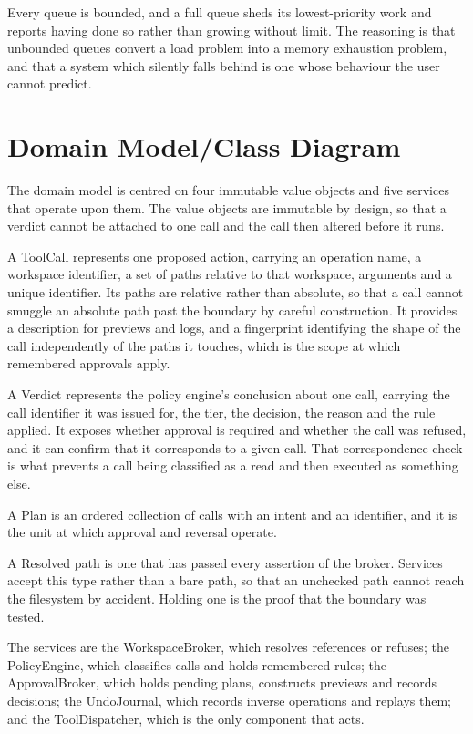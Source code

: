 \documentclass{FastFyp}
\begin{document}
Every queue is bounded, and a full queue sheds its lowest-priority work and reports having done so rather than growing without limit. The reasoning is that unbounded queues convert a load problem into a memory exhaustion problem, and that a system which silently falls behind is one whose behaviour the user cannot predict.

\section{Domain Model/Class Diagram}

The domain model is centred on four immutable value objects and five services that operate upon them. The value objects are immutable by design, so that a verdict cannot be attached to one call and the call then altered before it runs.

A ToolCall represents one proposed action, carrying an operation name, a workspace identifier, a set of paths relative to that workspace, arguments and a unique identifier. Its paths are relative rather than absolute, so that a call cannot smuggle an absolute path past the boundary by careful construction. It provides a description for previews and logs, and a fingerprint identifying the shape of the call independently of the paths it touches, which is the scope at which remembered approvals apply.

A Verdict represents the policy engine's conclusion about one call, carrying the call identifier it was issued for, the tier, the decision, the reason and the rule applied. It exposes whether approval is required and whether the call was refused, and it can confirm that it corresponds to a given call. That correspondence check is what prevents a call being classified as a read and then executed as something else.

A Plan is an ordered collection of calls with an intent and an identifier, and it is the unit at which approval and reversal operate.

A Resolved path is one that has passed every assertion of the broker. Services accept this type rather than a bare path, so that an unchecked path cannot reach the filesystem by accident. Holding one is the proof that the boundary was tested.

The services are the WorkspaceBroker, which resolves references or refuses; the PolicyEngine, which classifies calls and holds remembered rules; the ApprovalBroker, which holds pending plans, constructs previews and records decisions; the UndoJournal, which records inverse operations and replays them; and the ToolDispatcher, which is the only component that acts.
\end{document}
